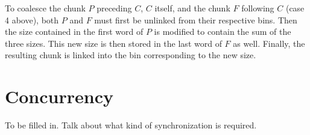 To coalesce the chunk $P$ preceding $C$, $C$ itself, and the chunk $F$
following $C$ (case 4 above), both $P$ and $F$ must first be unlinked
from their respective bins.  Then the size contained in the first word
of $P$ is modified to contain the sum of the three sizes.  This new
size is then stored in the last word of $F$ as well.  Finally, the
resulting chunk is linked into the bin corresponding to the new size.

\section{Concurrency}

To be filled in.  Talk about what kind of synchronization is required.

